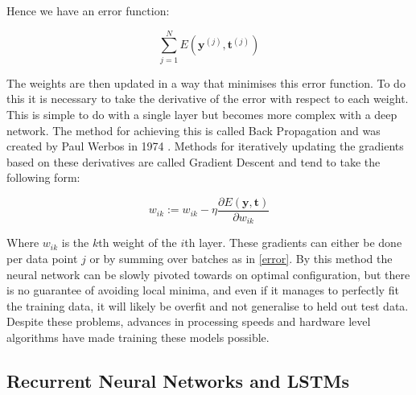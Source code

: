 \documentclass[bsc,singlespacing,logo, parskip, deptreport]{infthesis}
\begin{document}
\begin{center}
\end{center}

Hence we have an error function:

\begin{equation}
  \label{error}
  \sum_{j = 1}^{N} E(\bm{y}^{(j)}, \bm{t}^{(j)})
\end{equation}

The weights are then updated in a way that minimises this error function. To do this it is necessary to take the derivative of the error with respect to each weight. This is simple to do with a single layer but becomes more complex with a deep network. The method for achieving this is called Back Propagation and was created by Paul Werbos in 1974 \cite{werbos_1974}. Methods for iteratively updating the gradients based on these derivatives are called Gradient Descent and tend to take the following form:

\begin{equation}
  w_{ik} := w_{ik} - \eta \frac{\partial E(\bm{y}, \bm{t})}{\partial w_{ik}}
\end{equation}

Where $w_{ik}$ is the $k$th weight of the $i$th layer. These gradients can either be done per data point $j$ or by summing over batches as in \ref{error}. By this method the neural network can be slowly pivoted towards on optimal configuration, but there is no guarantee of avoiding local minima, and even if it manages to perfectly fit the training data, it will likely be overfit and not generalise to held out test data. Despite these problems, advances in processing speeds and hardware level algorithms \cite{kruger2003linear} have made training these models possible.

\subsection{Recurrent Neural Networks and LSTMs}
\end{document}
